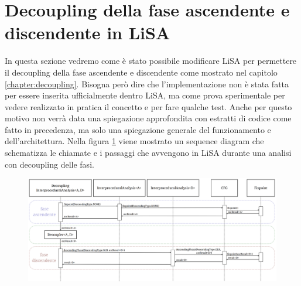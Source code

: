 \section{Decoupling della fase ascendente e discendente in LiSA}
In questa sezione vedremo come è stato possibile modificare LiSA per permettere il decoupling della fase ascendente e discendente come mostrato nel capitolo \ref{chapter:decoupling}. Bisogna però dire che l'implementazione non è stata fatta per essere inserita ufficialmente dentro LiSA, ma come prova sperimentale per vedere realizzato in pratica il concetto e per fare qualche test. Anche per questo motivo non verrà data una spiegazione approfondita con estratti di codice come fatto in precedenza, ma solo una spiegazione generale del funzionamento e dell'architettura. Nella figura \ref{fig:flowDecoupling} viene mostrato un sequence diagram che schematizza le chiamate e i passaggi che avvengono in LiSA durante una analisi con decoupling delle fasi. 
\begin{figure}[ht]
	\centering
	\includegraphics[width=\textwidth]{Immagini/decouplingFlow.png}
	\caption{}
	\label{fig:flowDecoupling}
\end{figure}

